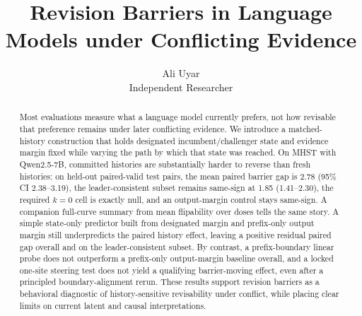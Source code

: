 \documentclass[10pt]{article}
\title{Revision Barriers in Language Models under Conflicting Evidence}
\author{\name Ali Uyar \\ \addr Independent Researcher}
\begin{document}
\maketitle

\begin{abstract}
Most evaluations measure what a language model currently prefers, not how revisable that preference remains under later conflicting evidence. We introduce a matched-history construction that holds designated incumbent/challenger state and evidence margin fixed while varying the path by which that state was reached. On MHST with Qwen2.5-7B, committed histories are substantially harder to reverse than fresh histories: on held-out paired-valid test pairs, the mean paired barrier gap is 2.78 (95\% CI 2.38--3.19), the leader-consistent subset remains same-sign at 1.85 (1.41--2.30), the required $k{=}0$ cell is exactly null, and an output-margin control stays same-sign. A companion full-curve summary from mean flipability over doses tells the same story. A simple state-only predictor built from designated margin and prefix-only output margin still underpredicts the paired history effect, leaving a positive residual paired gap overall and on the leader-consistent subset. By contrast, a prefix-boundary linear probe does not outperform a prefix-only output-margin baseline overall, and a locked one-site steering test does not yield a qualifying barrier-moving effect, even after a principled boundary-alignment rerun. These results support revision barriers as a behavioral diagnostic of history-sensitive revisability under conflict, while placing clear limits on current latent and causal interpretations.
\end{abstract}











\appendix

\end{document}
